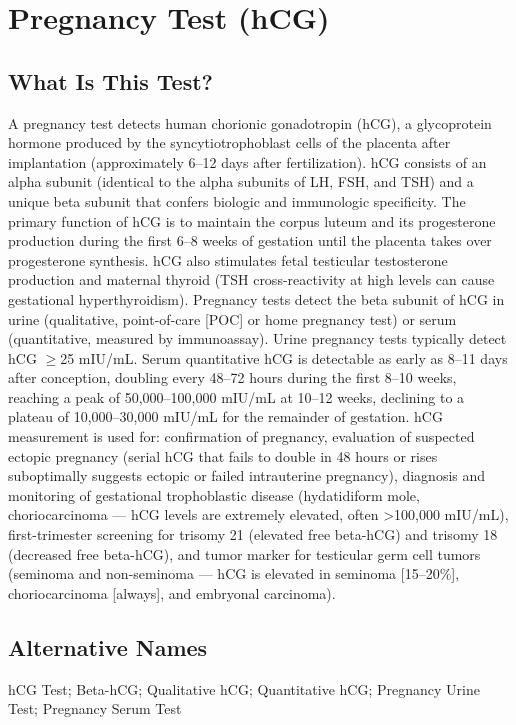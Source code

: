 \chapter{Pregnancy Test (hCG)}
\section*{What Is This Test?}
A pregnancy test detects human chorionic gonadotropin (hCG), a glycoprotein hormone produced by the syncytiotrophoblast cells of the placenta after implantation (approximately 6--12 days after fertilization). hCG consists of an alpha subunit (identical to the alpha subunits of LH, FSH, and TSH) and a unique beta subunit that confers biologic and immunologic specificity. The primary function of hCG is to maintain the corpus luteum and its progesterone production during the first 6--8 weeks of gestation until the placenta takes over progesterone synthesis. hCG also stimulates fetal testicular testosterone production and maternal thyroid (TSH cross-reactivity at high levels can cause gestational hyperthyroidism). Pregnancy tests detect the beta subunit of hCG in urine (qualitative, point-of-care [POC] or home pregnancy test) or serum (quantitative, measured by immunoassay). Urine pregnancy tests typically detect hCG $\geq$25 mIU/mL. Serum quantitative hCG is detectable as early as 8--11 days after conception, doubling every 48--72 hours during the first 8--10 weeks, reaching a peak of 50,000--100,000 mIU/mL at 10--12 weeks, declining to a plateau of 10,000--30,000 mIU/mL for the remainder of gestation. hCG measurement is used for: confirmation of pregnancy, evaluation of suspected ectopic pregnancy (serial hCG that fails to double in 48 hours or rises suboptimally suggests ectopic or failed intrauterine pregnancy), diagnosis and monitoring of gestational trophoblastic disease (hydatidiform mole, choriocarcinoma --- hCG levels are extremely elevated, often >100,000 mIU/mL), first-trimester screening for trisomy 21 (elevated free beta-hCG) and trisomy 18 (decreased free beta-hCG), and tumor marker for testicular germ cell tumors (seminoma and non-seminoma --- hCG is elevated in seminoma [15--20\%], choriocarcinoma [always], and embryonal carcinoma).
\section*{Alternative Names}
hCG Test; Beta-hCG; Qualitative hCG; Quantitative hCG; Pregnancy Urine Test; Pregnancy Serum Test
